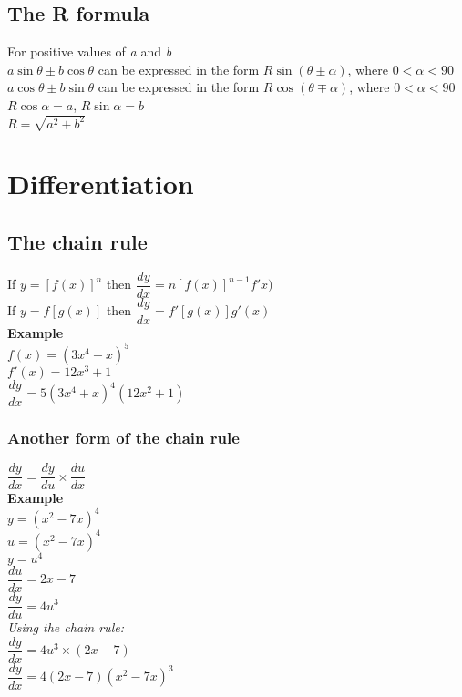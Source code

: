 \documentclass{article}[18pt]
\begin{document}
\subsection{The R formula}
For positive values of \textit{a} and \textit{b}
\\
$a\sin\theta\pm b\cos\theta$ can be expressed in the form $R\sin(\theta\pm\alpha)$, where $0<\alpha<90$
\\
$a\cos\theta\pm b\sin\theta$ can be expressed in the form $R\cos(\theta\mp\alpha)$, where $0<\alpha<90$ 
\\
$R\cos\alpha=a$, $R\sin\alpha=b$
\\
$R=\sqrt{a^2+b^2}$
\\
\section{Differentiation}
\subsection{The chain rule}
If $y=[f(x)]^n$ then $\dfrac{dy}{dx}=n[f(x)]^{n-1}f'x)$
\\
If $y=f[g(x)]$ then $\dfrac{dy}{dx}=f'[g(x)]g'(x)$
\\
\textbf{Example}
\\
$f(x)=(3x^4+x)^5$
\\
$f'(x)=12x^3+1$
\\
$\dfrac{dy}{dx}=5(3x^4+x)^4(12x^2+1)$
\\
\subsubsection{Another form of the chain rule}
$\dfrac{dy}{dx}=\dfrac{dy}{du}\times\dfrac{du}{dx}$
\\
\textbf{Example}
\\
$y=(x^2-7x)^4$
\\
$u=(x^2-7x)^4$
\\
$y=u^4$
\\
$\dfrac{du}{dx}=2x-7$\\
$\dfrac{dy}{du}=4u^3$\\
\textit{Using the chain rule:}\\
$\dfrac{dy}{dx}=4u^3\times(2x-7)$\\
$\dfrac{dy}{dx}=4(2x-7)(x^2-7x)^3$\\
\end{document}
